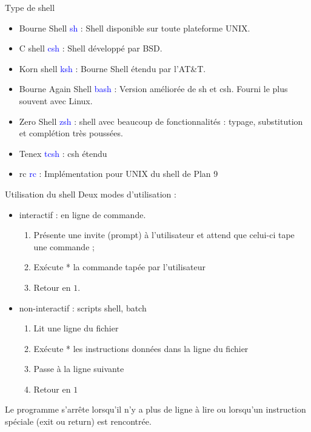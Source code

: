 \documentclass[10pt]{beamer}
\newcommand{\param}[1]{\textcolor{blue}{#1}}
\begin{document}
\begin{frame}{Type de shell}
\begin{itemize}
\item \alert{Bourne Shell}  \param{sh} : Shell disponible sur toute plateforme UNIX.
\item \alert{C shell}  \param{csh} : Shell développé par BSD.
\item \alert{Korn shell}  \param{ksh} : Bourne Shell étendu par l'AT\&T.
\item \alert{Bourne Again Shell} \param{bash} : Version améliorée de sh et csh. Fourni le plus souvent avec Linux.
\item \alert{Zero Shell}  \param{zsh} : shell avec beaucoup de fonctionnalités : typage, substitution et complétion très poussées.
\item \alert{Tenex} \param{tcsh}  : csh étendu
\item \alert{rc} \param{rc}  : Implémentation pour UNIX du shell de Plan 9
\end{itemize}
\end{frame}

\begin{frame}{Utilisation du shell}
Deux modes d'utilisation :
\begin{itemize}
\item interactif : en ligne de commande.
\begin{enumerate}
  \item Présente une invite (prompt) à l'utilisateur et attend que celui-ci tape une commande ;
  \item Exécute * la commande tapée par l'utilisateur
  \item Retour en $1$.
\end{enumerate}
\item non-interactif : scripts shell, batch
  \begin{enumerate}
  \item Lit une ligne du fichier
  \item Exécute * les instructions données dans la ligne du fichier
  \item Passe à la ligne suivante
  \item Retour en $1$
  \end{enumerate}
\end{itemize}

Le programme s'arrête lorsqu'il n'y a plus de ligne à lire ou lorsqu'un instruction spéciale (exit ou return) est rencontrée.

\end{frame}
\end{document}
